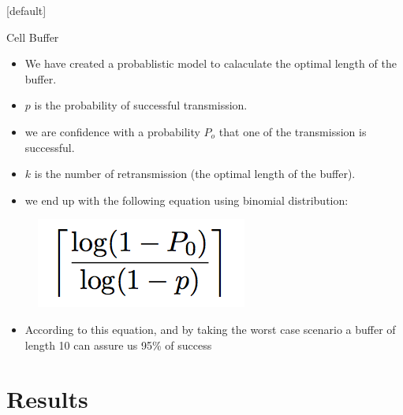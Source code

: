 \documentclass{beamer}
\makeatletter
\newenvironment{withoutheadline}{
        \setbeamertemplate{headline}[default]
        \def\beamer@entrycode{\vspace*{-\headheight}}
    }{}
\makeatother
\begin{document}
\begin{withoutheadline}
\begin{frame}{Cell Buffer}

\begin{itemize}
    \item We have created a probablistic model to calaculate the optimal length of the buffer.
    \item $p$ is the probability of successful transmission.
    \item we are confidence with a probability $P_{o}$ that one of the transmission is successful.
    \item $k$ is the number of retransmission (the optimal length of the buffer). 
    \item we end up with the following equation using binomial distribution:
    
    \end{itemize}
    
 \centering
\begin{figure}[p]

\includegraphics[width=0.3\linewidth]{9nq6n.png}
\end{figure}
\begin{itemize}
\item According to this equation, and by taking the worst case scenario a buffer of length 10 can assure us 95\% of success
 \end{itemize}
\end{frame}
\end{withoutheadline}

\section{Results}
\end{document}
